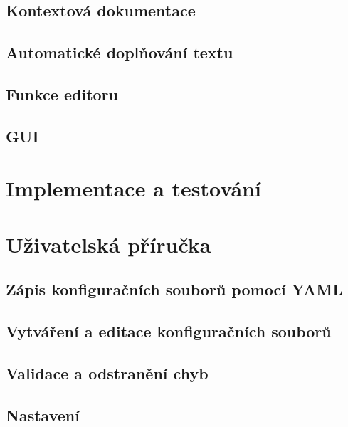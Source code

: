 \documentclass[FM,bw,DP]{tulthesis}
\begin{document}
\section{Kontextová dokumentace}

\section{Automatické doplňování textu}

\section{Funkce editoru}

\section{GUI}


\chapter{Implementace a testování}


\chapter{Uživatelská příručka}

\section{Zápis konfiguračních souborů pomocí YAML}

\section{Vytváření a editace konfiguračních souborů}

\section{Validace a odstranění chyb}

\section{Nastavení} 

\end{document}
